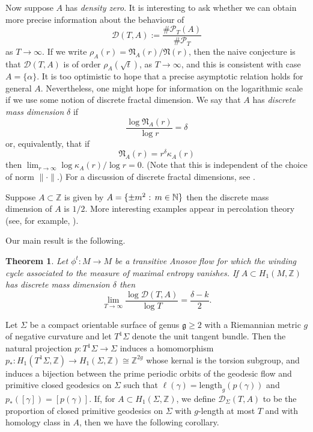 \documentclass[11pt]{amsart}
\newtheorem{theorem}{Theorem}
\theoremstyle{definition}
\newenvironment{example}[1][Example]{\begin{trivlist}
\item[\hskip \labelsep {\bfseries #1}]}{\end{trivlist}}
\numberwithin{equation}{section}
\numberwithin{theorem}{section}
\def\N{\mathbb{N}}
\def\Z{\mathbb{Z}}
\begin{document}
Now suppose $A$ has \emph{density zero}. It is interesting to ask whether we can obtain more precise 
information about the behaviour of 
\[
\mathscr D(T,A) := \frac{\#\mathscr P_T(A)}{\#\mathscr P_T}
\]
as $T \to \infty$. If we write $\rho_A(r) = \mathfrak N_A(r)/\mathfrak N(r)$, then the 
naive conjecture is that
$
\mathscr D(T,A)$ is of order $\rho_A(\sqrt{t})$, as $T \to \infty$, and this is consistent with 
case $A =\{\alpha\}$. It is too optimistic to hope that a precise asymptotic relation holds for general $A$. Nevertheless, one might hope for information on the logarithmic scale if we use some notion of discrete fractal dimension. We say that $A$ has {\it discrete mass dimension} $\delta$ if
\[
\frac{\log \mathfrak N_A(r)}{\log r} = \delta
\]
or, equivalently, that if 
\begin{equation}\label{eq:def_of_kappa}
\mathfrak N_A(r) =  r^{\delta}\kappa_A(r)
\end{equation}
then $\lim_{r \to \infty} \log \kappa_A(r)/\log r =0$.
(Note that this is independent of the choice of norm $\|\cdot\|$.)
For a discussion of discrete fractal dimensions, see \cite{BarlowTaylor}.

\begin{example}
Suppose $A \subset \Z$ is given by $A = \{\pm m^2 \hbox{ : } m \in \N\}$ then the discrete mass dimension
of $A$ is $1/2$. More interesting examples appear in percolation theory
(see, for example, \cite{Heydenreich}).
\end{example}

Our main result is the following.

\begin{theorem}\label{thm:main_logarithmic}
Let $\phi^t : M \to M$ be a transitive Anosov flow for which the winding cycle associated to the measure of maximal entropy vanishes.
If $A \subset H_1(M,\Z)$ has discrete mass dimension $\delta$ then
\[
\lim_{T \to \infty} \frac{\log \mathscr D(T,A)}{\log T} = \frac{\delta -k}{2}.
\]
\end{theorem}

Let $\Sigma$ be a compact orientable surface of genus $\mathfrak g \ge 2$ with a Riemannian
metric $g$ of negative curvature and let $T^1\Sigma$ denote the unit tangent bundle. 
Then the natural projection $p : T^1\Sigma \to \Sigma$ induces a homomorphism
$p_\ast : H_1(T^1\Sigma,\Z) \to H_1(\Sigma,\Z) \cong \Z^{2g}$ whose kernal
is the torsion subgroup, and induces a bijection between the prime periodic orbits of the geodesic flow and primitive closed geodesics on $\Sigma$ such that
$\ell(\gamma) = \mathrm{length}_g(p(\gamma))$ and $p_\ast([\gamma]) = [p(\gamma)]$.
If, for $A \subset H_1(\Sigma,\Z)$, we define
$
\mathscr D_{\Sigma}(T,A)$
to be the proportion of closed primitive geodesics on $\Sigma$ with $g$-length at most $T$ and
with homology class in $A$, then we have the following corollary.
\end{document}

